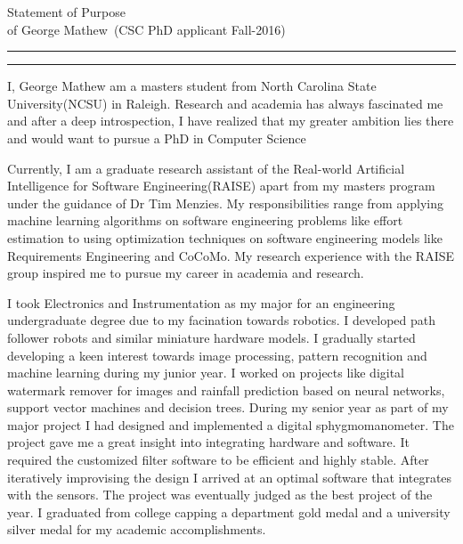\documentclass{article}
\newcommand{\soptitle}{Statement of Purpose}
\newcommand{\yourname}{George Mathew}
\begin{document}
\begin{center}\LARGE\soptitle\\
\large of \yourname\ (CSC PhD applicant Fall-2016)
\end{center}

\hrule
\vspace{1pt}
\hrule height 1pt

\bigskip

I, George Mathew am a masters student from North Carolina State University(NCSU) in Raleigh. Research and academia has always fascinated me and after a deep introspection, I have realized that my greater ambition lies there and would want to pursue a PhD in Computer Science

\bigskip
Currently, I am a graduate research assistant of the Real-world Artificial Intelligence for 
Software Engineering(RAISE) apart from my masters program under the guidance of Dr Tim Menzies.
 My responsibilities range from applying machine learning algorithms on software engineering 
 problems like effort estimation to using optimization techniques on software engineering models
 like Requirements Engineering and CoCoMo. My research experience with the RAISE group inspired me to
 pursue my career in academia and research. 

\bigskip

I took Electronics and Instrumentation as my major for an engineering undergraduate
degree due to my facination towards robotics. I developed path follower robots and similar
miniature hardware models. I gradually started developing a keen interest towards image 
processing, pattern recognition and machine learning during my junior year. I worked on 
projects like digital watermark remover for images and rainfall prediction based on neural 
networks, support vector machines and decision trees. During my senior year as part of 
my major project I had designed and implemented a digital sphygmomanometer. The project
gave me a great insight into integrating hardware and software. It required the customized 
filter software to be efficient and highly stable. After iteratively improvising the design I 
arrived at an optimal software that integrates with the sensors. The project was eventually 
judged as the best project of the year. I graduated from college capping a department gold 
medal and a university silver medal for my academic accomplishments.

\bigskip
\end{document}
